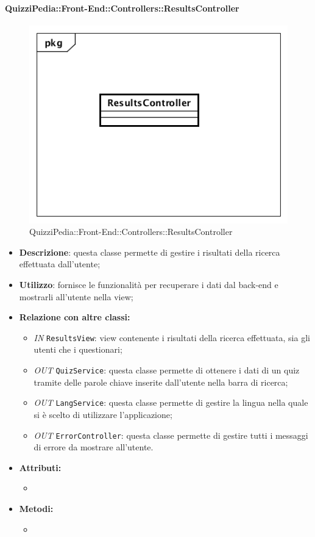 \paragraph{QuizziPedia::Front-End::Controllers::ResultsController}
\begin{figure}
	\centering
	\includegraphics[scale=0.45]{UML/Classi/Front-End/QuizziPedia_Front-end_Controller_ResultsController.png}
	\caption{QuizziPedia::Front-End::Controllers::ResultsController}
\end{figure}
\begin{itemize}
	\item \textbf{Descrizione}: questa classe permette di gestire i risultati della ricerca effettuata dall'utente;
	\item \textbf{Utilizzo}: fornisce le funzionalità per recuperare i dati dal back-end e mostrarli all'utente nella view;
	\item \textbf{Relazione con altre classi:}
	\begin{itemize}
		\item \textit{IN} \texttt{ResultsView}: view contenente i risultati della ricerca effettuata, sia gli utenti che i questionari; 
		\item \textit{OUT} \texttt{QuizService}: questa classe permette di ottenere i dati di un quiz tramite delle parole chiave inserite dall'utente nella barra di ricerca;
		\item \textit{OUT} \texttt{LangService}: questa classe permette di gestire la lingua nella quale si è scelto di utilizzare l'applicazione;
		\item \textit{OUT} \texttt{ErrorController}: questa classe permette di gestire tutti i messaggi di errore da mostrare all'utente.
	\end{itemize}
	\item \textbf{Attributi:}
	\begin{itemize}
		\item 
	\end{itemize}
	\item \textbf{Metodi:}
	\begin{itemize}
		\item 
	\end{itemize}
\end{itemize}


